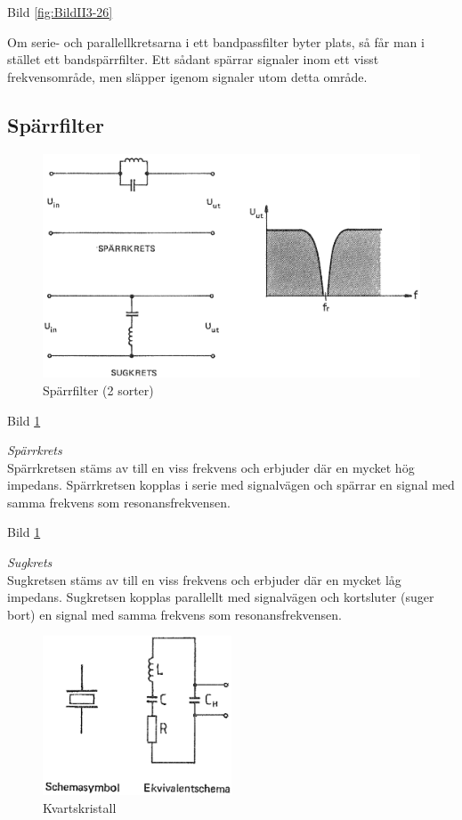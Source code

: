 Bild \ref{fig:BildII3-26}

Om serie- och parallellkretsarna i ett bandpassfilter byter plats, så får man
i stället ett bandspärrfilter. Ett sådant spärrar signaler inom ett visst
frekvensområde, men släpper igenom signaler utom detta område.

\subsection{Spärrfilter}

\begin{figure}
\includegraphics[width=\textwidth]{images/cropped_pdfs/bild_2_3-27.pdf}
\caption{Spärrfilter (2 sorter)}
\label{fig:BildII3-27}
\end{figure}

Bild \ref{fig:BildII3-27}

\emph{Spärrkrets} \\
Spärrkretsen stäms av till en viss frekvens och erbjuder där en mycket hög
impedans. Spärrkretsen kopplas i serie med signalvägen och spärrar en signal
med samma frekvens som resonansfrekvensen.

Bild \ref{fig:BildII3-27}

\emph{Sugkrets} \\
Sugkretsen stäms av till en viss frekvens och erbjuder där en mycket låg
impedans. Sugkretsen kopplas parallellt med signalvägen och kortsluter (suger
bort) en signal med samma frekvens som resonansfrekvensen.

\begin{figure}
\includegraphics[width=0.5\textwidth]{images/cropped_pdfs/bild_2_3-28.pdf}
\caption{Kvartskristall}
\label{fig:BildII3-28}
\end{figure}

